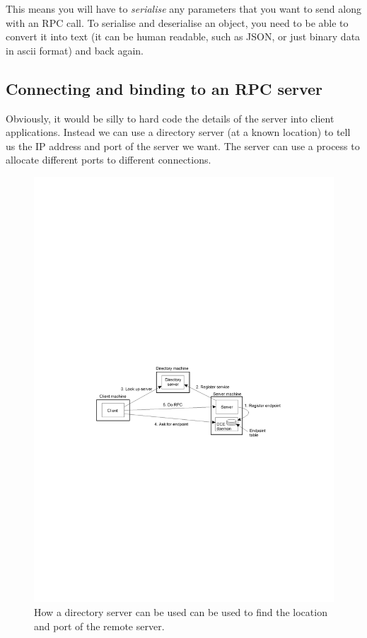 This means you will have to \textit{serialise} any parameters that you want to
send along with an RPC call. To serialise and deserialise an object, you need to
be able to convert it into text (it can be human readable, such as JSON, or just
binary data in ascii format) and back again.

\subsection{Connecting and binding to an RPC server}

Obviously, it would be silly to hard code the details of the server into client
applications. Instead we can use a directory server (at a known location) to
tell us the IP address and port of the server we want. The server can use a
process to allocate different ports to different connections.

\begin{figure}[H]
  \centering
  \includegraphics[width=\textwidth]{images/directory-server}
  \caption{How a directory server can be used can be used to find the location
  and port of the remote server.}
  \label{rpc-stub}
\end{figure}

